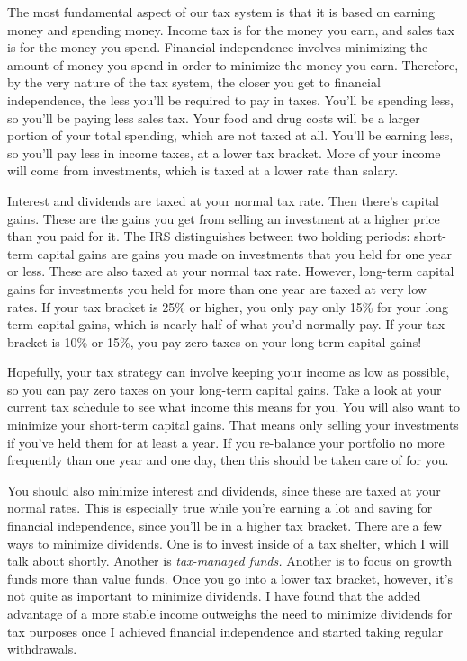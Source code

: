 The most fundamental aspect of our tax system is that it is based on earning money and spending money. Income tax is for the money you earn, and sales tax is for the money you spend. Financial independence involves minimizing the amount of money you spend in order to minimize the money you earn. Therefore, by the very nature of the tax system, the closer you get to financial independence, the less you'll be required to pay in taxes. You'll be spending less, so you'll be paying less sales tax. Your food and drug costs will be a larger portion of your total spending, which are not taxed at all. You'll be earning less, so you'll pay less in income taxes, at a lower tax bracket. More of your income will come from investments, which is taxed at a lower rate than salary.

Interest and dividends are taxed at your normal tax rate. Then there's capital gains. These are the gains you get from selling an investment at a higher price than you paid for it. The IRS distinguishes between two holding periods: short-term capital gains are gains you made on investments that you held for one year or less. These are also taxed at your normal tax rate. However, long-term capital gains for investments you held for more than one year are taxed at very low rates. If your tax bracket is 25\% or higher, you only pay only 15\% for your long term capital gains, which is nearly half of what you'd normally pay. If your tax bracket is 10\% or 15\%, you pay zero taxes on your long-term capital gains!

Hopefully, your tax strategy can involve keeping your income as low as possible, so you can pay zero taxes on your long-term capital gains. Take a look at your current tax schedule to see what income this means for you. You will also want to minimize your short-term capital gains. That means only selling your investments if you've held them for at least a year. If you re-balance your portfolio no more frequently than one year and one day, then this should be taken care of for you.

You should also minimize interest and dividends, since these are taxed at your normal rates. This is especially true while you're earning a lot and saving for financial independence, since you'll be in a higher tax bracket. There are a few ways to minimize dividends. One is to invest inside of a tax shelter, which I will talk about shortly. Another is \emph{tax-managed funds.} Another is to focus on growth funds more than value funds. Once you go into a lower tax bracket, however, it's not quite as important to minimize dividends. I have found that the added advantage of a more stable income outweighs the need to minimize dividends for tax purposes once I achieved financial independence and started taking regular withdrawals.

